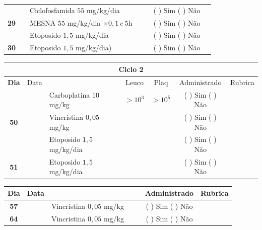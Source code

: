 \documentclass[11pt,a4paper,oldfontcommands]{memoir}
\begin{document}
\begin{center}
\begin{table}[H]
\begin{tabular}{p{1cm}c|p{4.8cm}|p{1.8cm}p{1.8cm}|c|c}
    \hline
    \multicolumn{1}{c|}{\multirow{3}{*}{\textbf{29}}}&&{Ciclofosfamida \(55\) mg/kg/dia}&\multicolumn{1}{c|}{}&&{(  ) Sim (  ) Não}&\\
    \cline{4-5}
    \multicolumn{1}{c|}{}&&{MESNA \(55\) mg/kg/dia \(\times 0,1 \:e\: 5\)h}&&&{(  ) Sim (  ) Não}&\\
    \multicolumn{1}{c|}{}&&{Etoposido \(1,5\) mg/kg/dia}&&&{(  ) Sim (  ) Não}&\\
    \hline
    \multicolumn{1}{c|}{\multirow{1}{*}{\textbf{30}}}&&{Etoposido \(1,5\) mg/kg/dia)}&{}&&{(  ) Sim (  ) Não}&\\
    \hline
\end{tabular}
\end{table}
\begin{table}[H] \small
\begin{tabular}{p{1cm}c|p{4.8cm}|p{1.8cm}p{1.8cm}|c|c}
	\hline
	\multicolumn{7}{c}{Ciclo 2} \\
	\hline
	\multicolumn{1}{c|}{\multirow{1}{*}{\textbf{Dia}}}&{Data}&{}&\multicolumn{1}{c|}{Leuco}&\multicolumn{1}{c|}{Plaq}&{Administrado}&{Rubrica} \\
    \hline
    \multicolumn{1}{c|}{\multirow{3}{*}{\textbf{50}}}&\multirow{2}{*}{}&{Carboplatina \(10\) mg/kg}&\multicolumn{1}{c|}{\(>10^3\)}&\multicolumn{1}{c|}{\(>10^5\)}&{(  ) Sim (  ) Não}&\\
    \cline{4-5}
    \multicolumn{1}{c|}{}&&{Vincristina \(0,05\) mg/kg}&\multicolumn{1}{c|}{}&&{(  ) Sim (  ) Não}&\\
    \cline{4-5}
    \multicolumn{1}{c|}{}&\multirow{1}{*}{}&{Etoposido \(1,5\) mg/kg/dia}&{}&&{(  ) Sim (  ) Não}&\\
    \cline{1-3}\cline{6-6}
    \multicolumn{1}{c|}{\textbf{51}}&\multirow{1}{*}{}&{Etoposido \(1,5\) mg/kg/dia}&{}&&{(  ) Sim (  ) Não}&\\
    \hline
\end{tabular}
\end{table}
\begin{table}[H] \small
\begin{tabular}{p{1cm}c|p{4.8cm}|p{1.8cm}p{1.8cm}|c|c}
	\hline
	\multicolumn{1}{c|}{\multirow{1}{*}{\textbf{Dia}}}&{Data}&{}&{}&&{Administrado}&{Rubrica} \\
    \hline
    \multicolumn{1}{c|}{\textbf{57}}&&{Vincristina \(0,05\) mg/kg}&\multicolumn{1}{c}{}&&{(  ) Sim (  ) Não}&\\
    \hline
    \multicolumn{1}{c|}{\textbf{64}}&&{Vincristina \(0,05\) mg/kg}&\multicolumn{1}{c}{}&&{(  ) Sim (  ) Não}&\\

\end{tabular}
\end{table}
\end{center}
\end{document}
